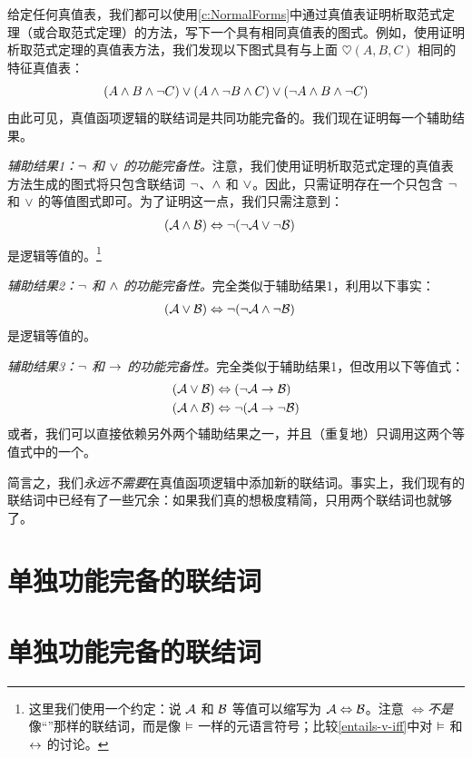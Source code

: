 给定任何真值表，我们都可以使用\cref{c:NormalForms}中通过真值表证明析取范式定理（或合取范式定理）的方法，写下一个具有相同真值表的图式。例如，使用证明析取范式定理的真值表方法，我们发现以下图式具有与上面 $\heartsuit(A,B,C)$ 相同的特征真值表：
		$$(A \wedge B \wedge \neg C) \vee (A \wedge \neg B \wedge C) \vee (\neg A \wedge B \wedge \neg C)$$
由此可见，真值函项逻辑的联结词是共同功能完备的。我们现在证明每一个辅助结果。

\emph{辅助结果1：$\neg$ 和 $\vee$ 的功能完备性。}注意，我们使用证明析取范式定理的真值表方法生成的图式将只包含联结词 $\neg$、$\wedge$ 和 $\vee$。因此，只需证明存在一个只包含 $\neg$ 和 $\vee$ 的等值图式即可。为了证明这一点，我们只需注意到：
		\begin{align*}
		(\mathcal{A} \wedge \mathcal{B}) & \Leftrightarrow \neg(\neg \mathcal{A} \vee\neg \mathcal{B})
		\end{align*}
		是逻辑等值的。\footnote{这里我们使用一个约定：说 $\mathcal{A}$ 和 $\mathcal{B}$ 等值可以缩写为 $\mathcal{A} \Leftrightarrow \mathcal{B}$。注意 $\Leftrightarrow$\emph{不是}像“\eiff”那样的联结词，而是像 $\vDash$ 一样的元语言符号；比较\cref{entails-v-iff}中对 $\vDash$ 和 $\leftrightarrow$ 的讨论。}

\emph{辅助结果2：$\neg$ 和 $\wedge$ 的功能完备性。}完全类似于辅助结果1，利用以下事实：
		\begin{align*}
		(\mathcal{A} \vee \mathcal{B}) & \Leftrightarrow \neg(\neg \mathcal{A} \wedge\neg \mathcal{B})
		\end{align*}
		是逻辑等值的。

\emph{辅助结果3：$\neg$ 和 $\rightarrow$ 的功能完备性。}完全类似于辅助结果1，但改用以下等值式：
		\begin{align*}
		(\mathcal{A} \vee \mathcal{B}) &\Leftrightarrow (\neg \mathcal{A} \rightarrow \mathcal{B})\\
		(\mathcal{A} \wedge \mathcal{B}) &\Leftrightarrow \neg(\mathcal{A} \rightarrow \neg\mathcal{B})
		\end{align*}
或者，我们可以直接依赖另外两个辅助结果之一，并且（重复地）只调用这两个等值式中的一个。

简言之，我们\emph{永远不需要}在真值函项逻辑中添加新的联结词。事实上，我们现有的联结词中已经有了一些冗余：如果我们真的想极度精简，只用两个联结词也就够了。

\ifHTMLtarget
\section{单独功能完备的联结词}
\else
\section[单独功能完备的联结词][功能完备的联结词]{单独功能完备的联结词}
\fi

